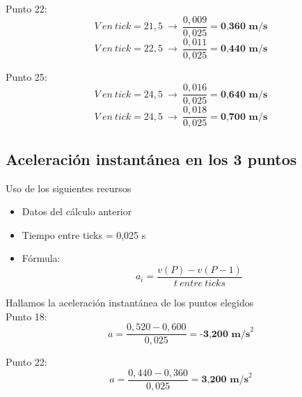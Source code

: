\documentclass[10pt]{article}
\begin{document}
\vspace{0,25cm}
Punto 22:
 \begin{equation*}
    V~en~tick = 21,5 ~ \longrightarrow~ \frac{0,009}{0,025} = \textbf{0,360~m/s}
\end{equation*}
\vspace{0,1cm}
 \begin{equation*}
    V~en~tick = 22,5 ~ \longrightarrow ~ \frac{0,011}{0,025} = \textbf{0,440~m/s}
\end{equation*}

\vspace{0,25cm}
Punto 25:
 \begin{equation*}
    V~en~tick = 24,5 ~ \longrightarrow ~ \frac{0,016}{0,025} = \textbf{0,640~m/s}
\end{equation*}
\vspace{0,1cm}
 \begin{equation*}
    V~en~tick = 24,5 ~ \longrightarrow ~ \frac{0,018}{0,025} = \textbf{0,700~m/s}
\end{equation*}
\vspace{-1mm}

\subsection{Aceleración instantánea en los 3 puntos}\vspace{2mm}

Uso de los siguientes recursos
\begin{itemize}
    \item Datos del cálculo anterior
    \item Tiempo entre ticks = 0,025 s
    \item Fórmula:
    \large{\begin{equation}
        a_{i} = \frac{v(P) - v(P-1)}{t~entre~ticks}
    \end{equation}}
\end{itemize}
\vspace{0,5cm}
Hallamos la aceleración instantánea de los puntos elegidos\\

Punto 18:
 \begin{equation*}
    a = \frac{0,520-0,600}{0,025} = \textbf{-3,200~m/s}^{2}
\end{equation*}
\vspace{0,2cm}

Punto 22:
 \begin{equation*}
    a = \frac{0,440-0,360}{0,025} = \textbf{3,200~m/s}^{2}
\end{equation*}
\vspace{0,2cm}
\end{document}
